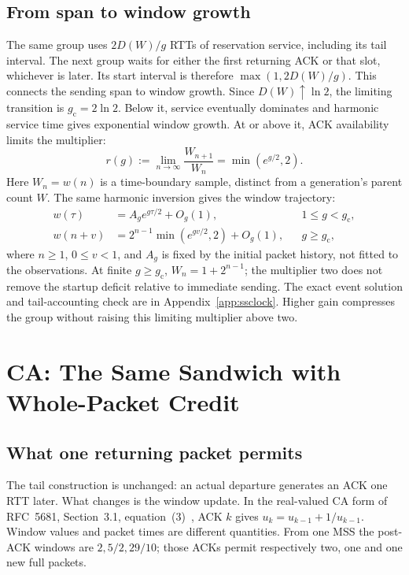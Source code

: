 \documentclass[sigconf,nonacm]{acmart}
\newcommand{\gc}{g_{\mathrm c}}
\begin{document}
\subsection{From span to window growth}
The same group uses $2D(W)/g$ RTTs of reservation service, including its
tail interval. The next group waits for either the first returning ACK or
that slot, whichever is later. Its start interval is therefore
$\max(1,2D(W)/g)$. This connects the sending span to window growth.
Since $D(W)\uparrow\ln2$, the limiting transition is
$\gc=2\ln2$. Below it, service eventually dominates and harmonic service
time gives exponential window growth. At or above it, ACK availability
limits the multiplier:
\begin{equation}
 r(g):=\lim_{n\to\infty}\frac{W_{n+1}}{W_n}=\min(e^{g/2},2).
 \label{eq:growth}
\end{equation}
Here $W_n=w(n)$ is a time-boundary sample, distinct from a generation's
parent count $W$. The same harmonic inversion gives the window trajectory:
\begin{equation}\begin{aligned}
 w(\tau)&=A_g e^{g\tau/2}+O_g(1),&&1\le g<\gc,\\
 w(n+v)&=2^{n-1}\min(e^{gv/2},2)+O_g(1),&&g\ge\gc,
\end{aligned}\label{eq:sswindow}\end{equation}
where $n\ge1$, $0\le v<1$, and $A_g$ is fixed by the initial packet history,
not fitted to the observations. At finite $g\ge\gc$, $W_n=1+2^{n-1}$;
the multiplier two does not remove the startup deficit relative to
immediate sending. The exact event solution and tail-accounting check are
in Appendix~\ref{app:ssclock}. Higher gain compresses the group without
raising this limiting multiplier above two.


\section{CA: The Same Sandwich with Whole-Packet Credit}\label{sec:ca}
\subsection{What one returning packet permits}
The tail construction is unchanged: an actual departure generates an ACK
one RTT later. What changes is the window update. In the real-valued CA
form of RFC~5681, Section~3.1, equation~(3)~\cite{rfc5681}, ACK $k$ gives
$u_k=u_{k-1}+1/u_{k-1}$. Window values and packet times are different
quantities. From one MSS the post-ACK windows are $2,5/2,29/10$; those
ACKs permit respectively two, one and one new full packets.
\end{document}
